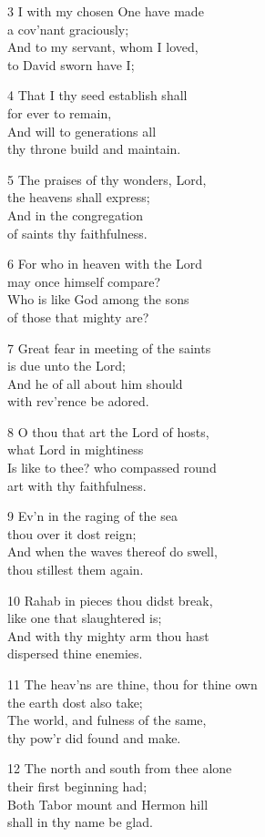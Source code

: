 3 I with my chosen One have made\\
a cov’nant graciously;\\
And to my servant, whom I loved,\\
to David sworn have I;

4 That I thy seed establish shall\\
for ever to remain,\\
And will to generations all\\
thy throne build and maintain.

5 The praises of thy wonders, Lord,\\
the heavens shall express;\\
And in the congregation\\
of saints thy faithfulness.

6 For who in heaven with the Lord\\
may once himself compare?\\
Who is like God among the sons\\
of those that mighty are?

7 Great fear in meeting of the saints\\
is due unto the Lord;\\
And he of all about him should\\
with rev’rence be adored.

8 O thou that art the Lord of hosts,\\
what Lord in mightiness\\
Is like to thee? who compassed round\\
art with thy faithfulness.

9 Ev’n in the raging of the sea\\
thou over it dost reign;\\
And when the waves thereof do swell,\\
thou stillest them again.

10 Rahab in pieces thou didst break,\\
like one that slaughtered is;\\
And with thy mighty arm thou hast\\
dispersed thine enemies.

11 The heav’ns are thine, thou for thine own\\
the earth dost also take;\\
The world, and fulness of the same,\\
thy pow’r did found and make.

12 The north and south from thee alone\\
their first beginning had;\\
Both Tabor mount and Hermon hill\\
shall in thy name be glad.

